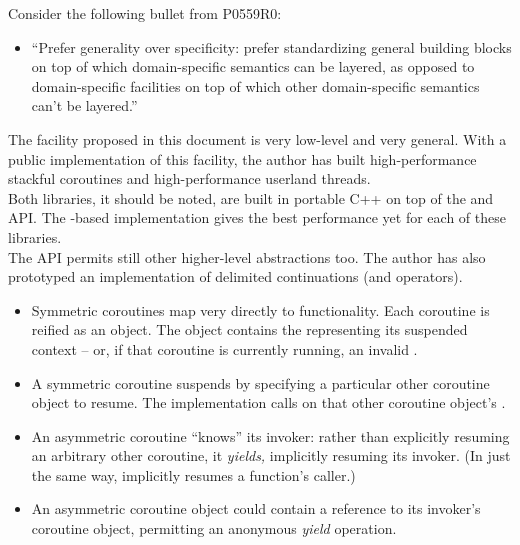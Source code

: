 
Consider the following bullet from P0559R0:\cite{P0559R0}

\begin{itemize}
\item ``Prefer generality over specificity: prefer standardizing general
  building blocks on top of which domain-specific semantics can be layered, as
  opposed to domain-specific facilities on top of which other domain-specific
  semantics can't be layered.''
\end{itemize}

The \callcc facility proposed in this document is very low-level and very
general. With a public implementation of this facility,\cite{bcontext} the
author has built high-performance stackful coroutines\cite{bcoroutine2} and
high-performance userland threads\cite{bfiber}.\\

Both libraries, it should be noted, are built in portable C++ on top of the
 and  API. The -based
implementation gives the best performance yet\cite{bfiberperf} for each of
these libraries.\\

The API permits still other higher-level abstractions too. The author has also
prototyped an implementation of delimited continuations (\shift and \reset
operators).
\newpage
{}

\begin{itemize}
\item Symmetric coroutines map very directly to  functionality.
  Each coroutine is reified as an object. The object contains the
   representing its suspended context -- or, if that
  coroutine is currently running, an invalid .
\item A symmetric coroutine suspends by specifying a particular other
  coroutine object to resume. The implementation calls \resume on that other
  coroutine object's .
\item An asymmetric coroutine ``knows'' its invoker: rather than explicitly
  resuming an arbitrary other coroutine, it \emph{yields,} implicitly resuming its
  invoker. (In just the same way,  implicitly resumes a function's
  caller.)
\item An asymmetric coroutine object could contain a reference to its
  invoker's coroutine object, permitting an anonymous \emph{yield} operation.
\end{itemize}


